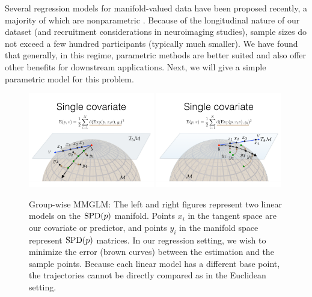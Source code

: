 Several regression models for manifold-valued data have been proposed recently, a majority of 
which are nonparametric \citep{jayasumanakernel,banerjee2015nonlinear}. 
Because of the longitudinal nature of our dataset (and recruitment considerations in neuroimaging studies),
sample sizes do not exceed a few hundred participants (typically much smaller). 
We have found that generally, in this regime, parametric methods are better suited and also offer other benefits for downstream applications. 
Next, we will give a simple parametric model for this problem. 
\begin{figure}[t]
  \centering
  \includegraphics[width=0.49\textwidth,trim={10 40 10 220},clip]{3_covtraj/figs/MGLM1.png}
    \includegraphics[width=0.49\textwidth,trim={10 40 10 220},clip]{3_covtraj/figs/MGLM2.png}
  \caption[Group-wise comparisons of manifold trajectories]{\label{fig:manifold}Group-wise MMGLM: The left and right figures represent two linear models on the $\text{SPD}(p)$ manifold. Points $x_i$ in the tangent space are our covariate or predictor, and points $y_i$ in the manifold space represent $\text{SPD}(p)$ matrices. In our regression setting, we wish to minimize the error (brown curves) between the estimation and the sample points. Because each linear model has a different base point, the trajectories cannot be directly compared as in the Euclidean setting.}
\end{figure}
